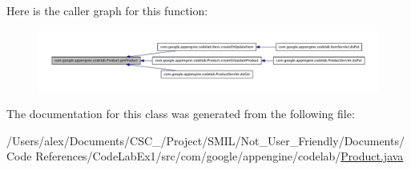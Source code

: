 Here is the caller graph for this function\-:
\nopagebreak
\begin{figure}[H]
\begin{center}
\leavevmode
\includegraphics[width=350pt]{classcom_1_1google_1_1appengine_1_1codelab_1_1_product_a8281f8c29702347f39fcb651db5e073f_icgraph}
\end{center}
\end{figure}




The documentation for this class was generated from the following file\-:\begin{DoxyCompactItemize}
\item 
/\-Users/alex/\-Documents/\-C\-S\-C\-\_/\-Project/\-S\-M\-I\-L/\-Not\-\_\-\-User\-\_\-\-Friendly/\-Documents/\-Code References/\-Code\-Lab\-Ex1/src/com/google/appengine/codelab/\hyperlink{_product_8java}{Product.\-java}\end{DoxyCompactItemize}

